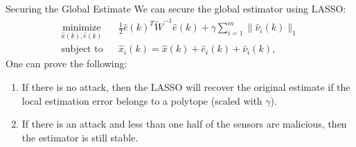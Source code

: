 \documentclass{beamer}
\begin{document}
\begin{frame}{Securing the Global Estimate}
We can secure the global estimator using LASSO:
\begin{align*}
  &\mathop{\textrm{minimize}}\limits_{\hat x(k),\hat e(k)}&
  & \frac{1}{2}\hat e(k)^T \tilde W^{-1} \hat e(k) + \gamma \sum_{i=1}^m \|\hat \nu_i(k)\|_1\\
  &\textrm{subject to} &
  &\hat x_i(k)  =  \hat x(k) + \hat e_i(k)+\hat \nu_i(k),&
\end{align*}
One can prove the following:
\begin{enumerate}
\item If there is no attack, then the LASSO will recover the original estimate if the local estimation error belongs to a polytope (scaled with $\gamma$).
\item If there is an attack and less than one half of the sensors are malicious, then the estimator is still stable.
\end{enumerate}
\end{frame}
% 
\end{document}

